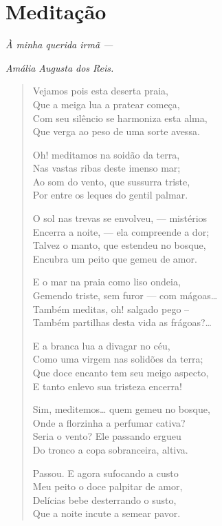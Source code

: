 \chapter{Meditação}

\hfill{}\emph{À minha querida irmã ---}

\hfill{}\emph{Amália Augusta dos Reis.}

\begin{verse}
Vejamos pois esta deserta praia,\\
Que a meiga lua a pratear começa,\\
Com seu silêncio se harmoniza esta alma,\\
Que verga ao peso de uma sorte avessa.

Oh! meditamos na soidão da terra,\\
Nas vastas ribas deste imenso mar;\\
Ao som do vento, que sussurra triste,\\
Por entre os leques do gentil palmar.

O sol nas trevas se envolveu, --- mistérios\\
Encerra a noite, --- ela compreende a dor;\\
Talvez o manto, que estendeu no bosque,\\
Encubra um peito que gemeu de amor.

E o mar na praia como liso ondeia,\\
Gemendo triste, sem furor --- com mágoas\ldots{}\\
Também meditas, oh! salgado pego --\\
Também partilhas desta vida as frágoas?\ldots{}

E a branca lua a divagar no céu,\\
Como uma virgem nas solidões da terra;\\
Que doce encanto tem seu meigo aspecto,\\
E tanto enlevo sua tristeza encerra!

Sim, meditemos\ldots{} quem gemeu no bosque,\\
Onde a florzinha a perfumar cativa?\\
Seria o vento? Ele passando ergueu\\
Do tronco a copa sobranceira, altiva.

Passou. E agora sufocando a custo\\
Meu peito o doce palpitar de amor,\\
Delícias bebe desterrando o susto,\\
Que a noite incute a semear pavor.


\end{verse}
